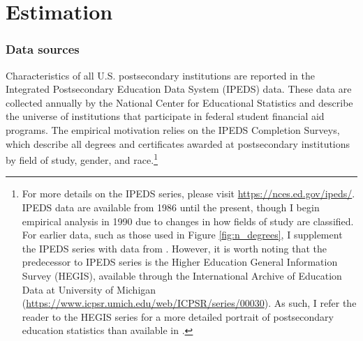 \documentclass[10 pt]{article}
\begin{document}


\section{Estimation}

\subsubsection*{Data sources}

Characteristics of all U.S. postsecondary institutions are reported in the Integrated Postsecondary Education Data System (IPEDS) data.
These data are collected annually by the National Center for Educational Statistics and describe the universe of institutions that participate in federal student financial aid programs. 
The empirical motivation relies on the IPEDS Completion Surveys, which describe all degrees and certificates awarded at postsecondary institutions by field of study, gender, and race.\footnote{
    For more details on the IPEDS series, please visit \url{https://nces.ed.gov/ipeds/}.
    IPEDS data are available from 1986 until the present, though I begin empirical analysis in 1990 due to changes in how fields of study are classified.
    For earlier data, such as those used in Figure \ref{fig:n_degrees}, I supplement the IPEDS series with data from \textcite{S93}.
    However, it is worth noting that the predecessor to IPEDS series is the Higher Education General Information Survey (HEGIS), available through the International Archive of Education Data at University of Michigan (\url{https://www.icpsr.umich.edu/web/ICPSR/series/00030}). As such, I refer the reader to the HEGIS series for a more detailed portrait of postsecondary education statistics than available in \textcite{S93}.
}
% 

\printbibliography
\end{document}
